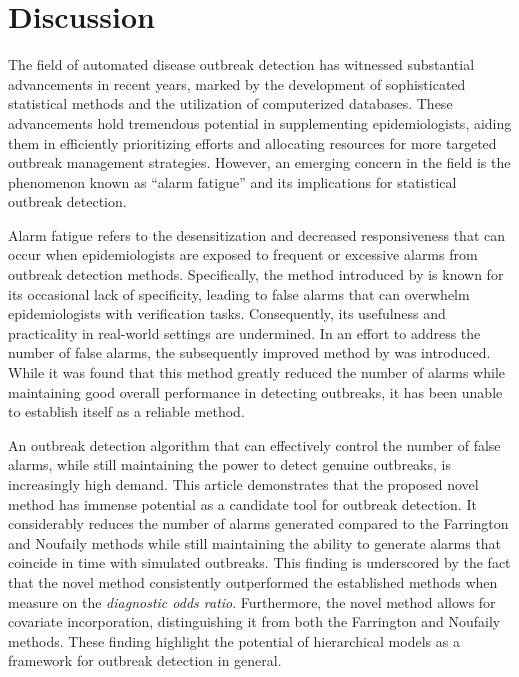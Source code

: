 \documentclass[preprint, 3p, authoryear]{elsarticle} %
\begin{document}
\hypertarget{discussion}{%
\section{Discussion}\label{discussion}}

The field of automated disease outbreak detection has witnessed substantial advancements in recent years, marked by the development of sophisticated statistical methods and the utilization of computerized databases. These advancements hold tremendous potential in supplementing epidemiologists, aiding them in efficiently prioritizing efforts and allocating resources for more targeted outbreak management strategies. However, an emerging concern in the field is the phenomenon known as ``alarm fatigue'' and its implications for statistical outbreak detection.

Alarm fatigue refers to the desensitization and decreased responsiveness that can occur when epidemiologists are exposed to frequent or excessive alarms from outbreak detection methods. Specifically, the method introduced by \citet{Farrington_1996} is known for its occasional lack of specificity, leading to false alarms that can overwhelm epidemiologists with verification tasks. Consequently, its usefulness and practicality in real-world settings are undermined. In an effort to address the number of false alarms, the subsequently improved method by \citet{Noufaily_2013} was introduced. While it was found that this method greatly reduced the number of alarms while maintaining good overall performance in detecting outbreaks, it has been unable to establish itself as a reliable method.

An outbreak detection algorithm that can effectively control the number of false alarms, while still maintaining the power to detect genuine outbreaks, is increasingly high demand. This article demonstrates that the proposed novel method has immense potential as a candidate tool for outbreak detection. It considerably reduces the number of alarms generated compared to the Farrington and Noufaily methods while still maintaining the ability to generate alarms that coincide in time with simulated outbreaks. This finding is underscored by the fact that the novel method consistently outperformed the established methods when measure on the \emph{diagnostic odds ratio}. Furthermore, the novel method allows for covariate incorporation, distinguishing it from both the Farrington and Noufaily methods. These finding highlight the potential of hierarchical models as a framework for outbreak detection in general.
\end{document}
